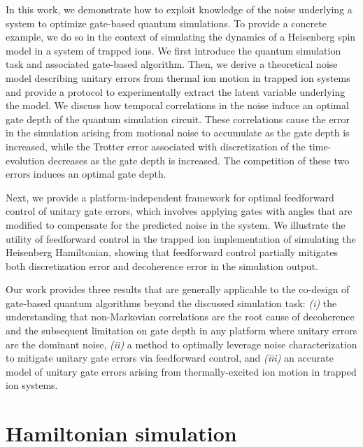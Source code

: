 \documentclass[prx,aps,twocolumn,showpacs,superscriptaddress,10pt]{revtex4-1}
\begin{document}
In this work, we demonstrate how to exploit knowledge of the noise underlying a system to optimize gate-based quantum simulations. To provide a concrete example, we do so in the context of simulating the dynamics of a Heisenberg spin model in a system of trapped ions. We first introduce the quantum simulation task and associated gate-based algorithm. Then, we derive a theoretical noise model describing unitary errors from thermal ion motion in trapped ion systems and provide a protocol to experimentally extract the latent variable underlying the model. We discuss how temporal correlations in the noise induce an optimal gate depth of the quantum simulation circuit. These correlations cause the error in the simulation arising from motional noise to accumulate as the gate depth is increased, while the Trotter error associated with discretization of the time-evolution decreases as the gate depth is increased. The competition of these two errors induces an optimal gate depth.

Next, we provide a platform-independent framework for optimal feedforward control of unitary gate errors, which involves applying gates with angles that are modified to compensate for the predicted noise in the system. We illustrate the utility of feedforward control in the trapped ion implementation of simulating the Heisenberg Hamiltonian, showing that feedforward control partially mitigates both discretization error and decoherence error in the simulation output. 

Our work provides three results that are generally applicable to the co-design of gate-based quantum algorithms beyond the discussed simulation task: \textit{(i)} the understanding that non-Markovian correlations are the root cause of decoherence and the subsequent limitation on gate depth in any platform where unitary errors are the dominant noise, \textit{(ii)} a method to optimally leverage noise characterization to mitigate unitary gate errors via feedforward control, and \textit{(iii)} an accurate model of unitary gate errors arising from thermally-excited ion motion in trapped ion systems.

\section{Hamiltonian simulation}
\label{sec:HamSim}
\end{document}

